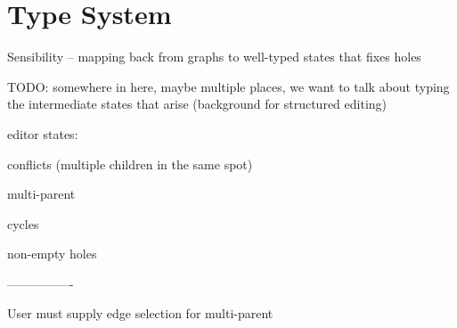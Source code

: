\section{Type System}%
\label{sec:Type System}

Sensibility -- mapping back from graphs
to well-typed states that fixes holes

TODO: somewhere in here, maybe multiple places, we want to talk about typing the intermediate states that arise (background for structured editing)

editor states:

conflicts (multiple children in the same spot)

multi-parent

cycles

non-empty holes

----------------

User must supply edge selection for multi-parent
